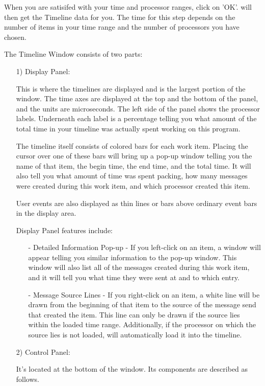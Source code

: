 \documentclass[10pt]{article}
\begin{document}
When you are satisifed with your time and processor ranges, click on
'OK'.  \projections{} will then get the Timeline data for you.  The
time for this step depends on the number of items in your time range
and the number of processors you have chosen.

The Timeline Window consists of two parts:
\begin{enumerate}
\item[1)]
Display Panel:

This is where the timelines are displayed and is the largest portion
of the window.  The time axes are displayed at the top and the bottom
of the panel, and the units are microseconds.  The left side of the
panel shows the processor labels.  Underneath each label is a
percentage telling you what amount of the total time in your timeline
was actually spent working on this program.

The timeline itself consists of colored bars for each work item.
Placing the cursor over one of these bars will bring up a pop-up
window telling you the name of that item, the begin time, the end
time, and the total time.  It will also tell you what amount of time
was spent packing, how many messages were created during this work
item, and which processor created this item. 

User events are also displayed as thin lines or bars above ordinary
event bars in the display area.

Display Panel features include:
   \begin{itemize}
   \item[-] 
   Detailed Information Pop-up - If you left-click on an item, a
   window will appear telling you similar information to the pop-up
   window.  This window will also list all of the messages created
   during this work item, and it will tell you what time they were
   sent at and to which entry.
   \item[-]
   Message Source Lines - If you right-click on an item, a white line
   will be drawn from the beginning of that item to the source of the
   message send that created the item. This line can only be drawn if
   the source lies within the loaded time range. Additionally, if the
   processor on which the source lies is not loaded, \projections{}
   will automatically load it into the timeline.
   \end{itemize}

\item[2)]
Control Panel:

It's located at the bottom of the window. Its components are described
as follows.


\end{enumerate}
\end{document}

